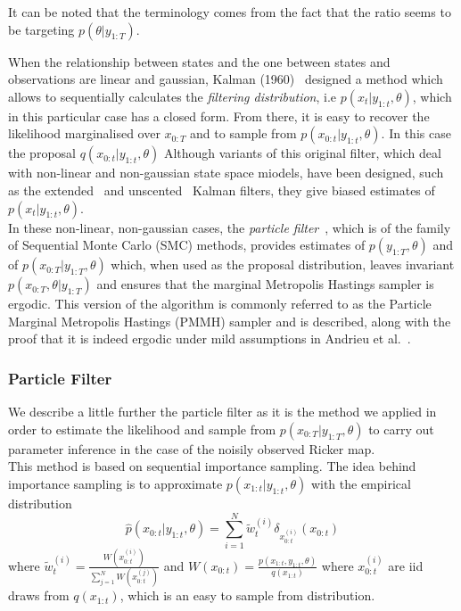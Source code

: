 \documentclass{article}
\begin{document}
	It can be noted that the terminology comes from the fact that the ratio seems to be targeting $p(\theta | y_{1:T})$.
	
 	When the relationship between states and the one between states and observations are linear and gaussian, Kalman (1960)~\cite{Kalman1960} designed a method which allows to sequentially calculates the \emph{filtering distribution}, i.e $p(x_{t}| y_{1:t}, \theta)$, which in this particular case has a closed form. From there, it is easy to recover the likelihood marginalised over $x_{0:T}$ and to sample from $p(x_{0:t}| y_{1:t}, \theta)$. In this case the proposal $q(x_{0:t}| y_{1:t}, \theta)$ Although variants of this original filter, which deal with non-linear and non-gaussian state space miodels, have been designed, such as the extended~\cite{McElhoe1966} and unscented~\cite{Julier1997} Kalman filters, they give biased estimates of $p(x_t|y_{1:t}, \theta)$. \\
 	
 	In these non-linear, non-gaussian cases, the \emph{particle filter}~\cite{Gordon1993}, which is of the family of Sequential Monte Carlo (SMC) methods, provides estimates of $p(y_{1:T}, \theta)$ and of $p(x_{0:T}|y_{1:T}, \theta)$ which, when used as the proposal distribution, leaves invariant $p(x_{0:T}, \theta|y_{1:T})$ and ensures that the marginal Metropolis Hastings sampler is ergodic. This version of the algorithm is commonly referred to as the Particle Marginal Metropolis Hastings (PMMH) sampler and is described, along with the proof that it is indeed ergodic under mild assumptions in Andrieu et al.~\cite{andrieu2010particle}.
	
	\subsubsection{Particle Filter}
	We describe a little further the particle filter as it is the method we applied in order to estimate the likelihood and sample from $p(x_{0:T}|y_{1:T}, \theta)$ to carry out parameter inference in the case of the noisily observed Ricker map. \\
	This method is based on sequential importance sampling.
	The idea behind importance sampling is to approximate $p(x_{1:t}|y_{1:t}, \theta)$ with the empirical distribution
	\begin{equation}
	\hat{p}(x_{0:t}|y_{1:t}, \theta) = \sum_{i=1}^{N}\tilde{w}_t^{(i)} \delta_{x_{0:t}^{(i)}}(x_{0:t})
	\end{equation}
	where $\tilde{w}_t^{(i)} = \frac{W(x_{0:t}^{(i)})}{\sum_{j=1}^{N} W(x_{0:t}^{(j)})}$ and $W(x_{0:t}) = \frac{p(x_{1:t},y_{1:t}, \theta)}{q(x_{1:t})}$ where $x_{0:t}^{(i)}$ are iid draws from $q(x_{1:t})$, which is an easy to sample from distribution.
	
\end{document}
